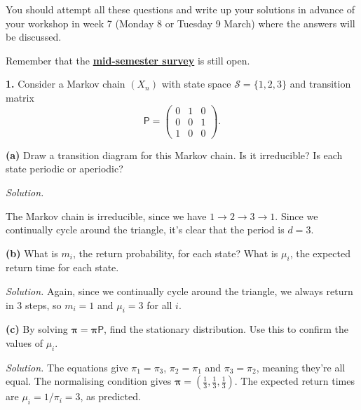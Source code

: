 \documentclass[
  a4paper,
]{article}
\newif\ifcomm\commtrue
\theoremstyle{definition}
\theoremstyle{definition}
\theoremstyle{definition}
\theoremstyle{remark}
\begin{document}
\commfalse

You should attempt all these questions and write up your solutions in advance of your workshop in week 7 (Monday 8 or Tuesday 9 March) where the answers will be discussed.

Remember that the \textbf{\href{https://forms.office.com/Pages/ResponsePage.aspx?id=qO3qvR3IzkWGPlIypTW3ywARQdZlKXRHsLcXi_ngX8NUM0NLOFFaQURFVExJMklIRjdVM04wQk8xTy4u}{mid-semester survey}} is still open.

\textbf{1.} Consider a Markov chain \((X_n)\) with state space \(\mathcal S =\{1,2,3\}\) and transition matrix
\[ \mathsf P = \begin{pmatrix} 0 & 1 & 0 \\ 0 & 0 & 1 \\ 1 & 0 & 0 \end{pmatrix}.   \]

\textbf{(a)} Draw a transition diagram for this Markov chain. Is it irreducible? Is each state periodic or aperiodic?

\begin{myanswers}

\emph{Solution.}

The Markov chain is irreducible, since we have \(1 \to 2 \to 3 \to 1\). Since we continually cycle around the triangle, it's clear that the period is \(d = 3\).

\end{myanswers}

\textbf{(b)} What is \(m_i\), the return probability, for each state? What is \(\mu_i\), the expected return time for each state.

\begin{myanswers}

\emph{Solution.}
Again, since we continually cycle around the triangle, we always return in \(3\) steps, so \(m_i = 1\) and \(\mu_i =3\) for all \(i\).

\end{myanswers}

\textbf{(c)} By solving \(\boldsymbol \pi = \boldsymbol\pi \mathsf P\), find the stationary distribution. Use this to confirm the values of \(\mu_i\).

\begin{myanswers}

\emph{Solution.}
The equations give \(\pi_1 = \pi_3\), \(\pi_2 = \pi_1\) and \(\pi_3 = \pi_2\), meaning they're all equal. The normalising condition gives \(\boldsymbol\pi = (\frac13, \frac13, \frac13)\). The expected return times are \(\mu_i = 1/\pi_i = 3\), as predicted.

\end{myanswers}
\end{document}
